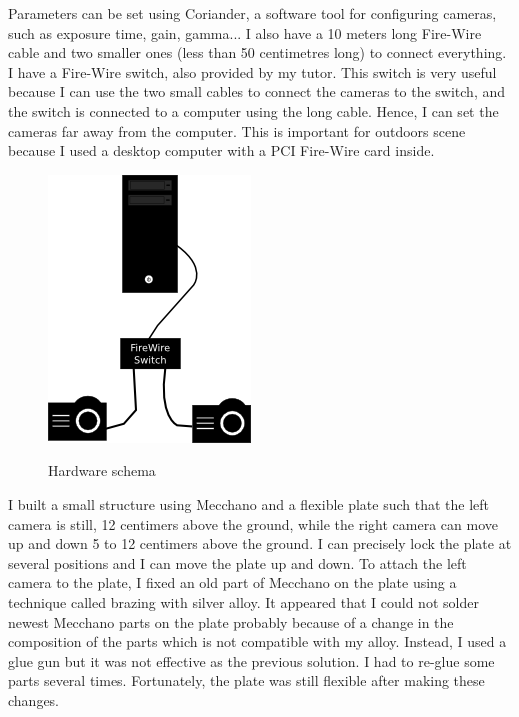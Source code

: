 \documentclass[11pt]{report}
\begin{document}
Parameters can be set using Coriander, a software tool for configuring cameras, such as exposure time, gain, gamma... I also have a 10 meters long Fire-Wire cable and two smaller ones (less than 50 centimetres long) to connect everything. I have a Fire-Wire switch, also provided by my tutor. This switch is very useful because I can use the two small cables to connect the cameras to the switch, and the switch is connected to a computer using the long cable. Hence, I can set the cameras far away from the computer. This is important for outdoors scene because I used a desktop computer with a PCI Fire-Wire card inside.
\begin{figure}[h]
    \begin{center}
        \includegraphics[scale=0.2]{images/setup.png} 
        \label{fig:hardware-schema}
        \caption{Hardware schema}
    \end{center}
\end{figure}

I built a small structure using Mecchano and a flexible plate such that the left camera is still, 12 centimers above the ground, while the right camera can move up and down 5 to 12 centimers above the ground. I can precisely lock the plate at several positions and I can move the plate up and down. To attach the left camera to the plate, I fixed an old part of Mecchano on the plate using a technique called brazing with silver alloy. It appeared that I could not solder newest Mecchano parts on the plate probably because of a change in the composition of the parts which is not compatible with my alloy. Instead, I used a glue gun but it was not effective as the previous solution. I had to re-glue some parts several times. Fortunately, the plate was still flexible after making these changes.
\end{document}
